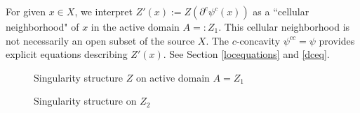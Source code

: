 \documentclass[12pt]{amsart}
\theoremstyle{definition}
\theoremstyle{remark}
\newcommand{\del}{\partial}
\begin{document}


For given $x\in X$, we interpret $Z'(x):=Z(\del^c \psi^c (x))$ as a ``cellular neighborhood" of $x$ in the active domain $A=:Z_1$. This cellular neighborhood is not necessarily an open subset of the source $X$. The $c$-concavity $\psi^{cc}=\psi$ provides explicit equations describing $Z'(x)$. See Section \ref{locequations} and \eqref{dceq}. 



\begin{figure}
\centering
\caption{Singularity structure $Z$ on active domain $A=Z_1$}
\end{figure}

\begin{figure}
\centering
\caption{Singularity structure on $Z_2$}
\end{figure}












\end{document}
